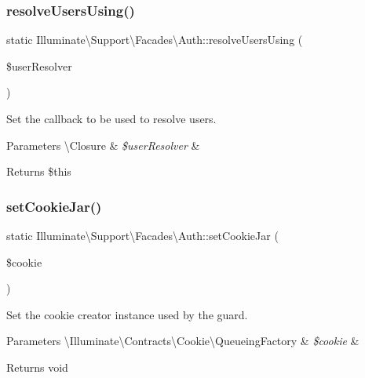 \subsubsection{\texorpdfstring{resolve\+Users\+Using()}{resolveUsersUsing()}}
{\footnotesize\ttfamily static Illuminate\textbackslash{}\+Support\textbackslash{}\+Facades\textbackslash{}\+Auth\+::resolve\+Users\+Using (\begin{DoxyParamCaption}\item[{}]{\$user\+Resolver }\end{DoxyParamCaption})\hspace{0.3cm}{\ttfamily [static]}}

Set the callback to be used to resolve users.


\begin{DoxyParams}[1]{Parameters}
\textbackslash{}\+Closure & {\em \$user\+Resolver} & \\
\hline
\end{DoxyParams}
\begin{DoxyReturn}{Returns}
\$this 
\end{DoxyReturn}
\mbox{\label{class_illuminate_1_1_support_1_1_facades_1_1_auth_a89cb1bc85a383e7453d7b940651a4a04}} 
\subsubsection{\texorpdfstring{set\+Cookie\+Jar()}{setCookieJar()}}
{\footnotesize\ttfamily static Illuminate\textbackslash{}\+Support\textbackslash{}\+Facades\textbackslash{}\+Auth\+::set\+Cookie\+Jar (\begin{DoxyParamCaption}\item[{}]{\$cookie }\end{DoxyParamCaption})\hspace{0.3cm}{\ttfamily [static]}}

Set the cookie creator instance used by the guard.


\begin{DoxyParams}[1]{Parameters}
\textbackslash{}\+Illuminate\textbackslash{}\+Contracts\textbackslash{}\+Cookie\textbackslash{}\+Queueing\+Factory & {\em \$cookie} & \\
\hline
\end{DoxyParams}
\begin{DoxyReturn}{Returns}
void 
\end{DoxyReturn}
\mbox{\label{class_illuminate_1_1_support_1_1_facades_1_1_auth_ae76bb55b5f629f397cc1e4e6c1c7b214}} 
